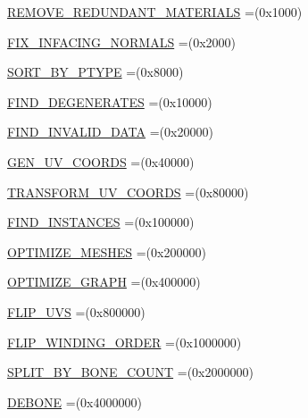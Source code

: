 \begin{DoxyCompactItemize}
\item 
\hyperlink{enumjassimp_1_1_ai_post_process_steps_a7de1d3d57df60b08b9484e6055c1b309}{R\+E\+M\+O\+V\+E\+\_\+\+R\+E\+D\+U\+N\+D\+A\+N\+T\+\_\+\+M\+A\+T\+E\+R\+I\+A\+L\+S} =(0x1000)
\item 
\hyperlink{enumjassimp_1_1_ai_post_process_steps_a21e006d635a60564ed5740bce344f1bc}{F\+I\+X\+\_\+\+I\+N\+F\+A\+C\+I\+N\+G\+\_\+\+N\+O\+R\+M\+A\+L\+S} =(0x2000)
\item 
\hyperlink{enumjassimp_1_1_ai_post_process_steps_a90814c095595a8cb812895e1cc2d97a6}{S\+O\+R\+T\+\_\+\+B\+Y\+\_\+\+P\+T\+Y\+P\+E} =(0x8000)
\item 
\hyperlink{enumjassimp_1_1_ai_post_process_steps_abf87e4bf911759a4141e5ba4596e29c1}{F\+I\+N\+D\+\_\+\+D\+E\+G\+E\+N\+E\+R\+A\+T\+E\+S} =(0x10000)
\item 
\hyperlink{enumjassimp_1_1_ai_post_process_steps_a391f51b2cf726a35d365a0a79ee16cbc}{F\+I\+N\+D\+\_\+\+I\+N\+V\+A\+L\+I\+D\+\_\+\+D\+A\+T\+A} =(0x20000)
\item 
\hyperlink{enumjassimp_1_1_ai_post_process_steps_a828a5efc49f107dce2ce4c4bcf11167c}{G\+E\+N\+\_\+\+U\+V\+\_\+\+C\+O\+O\+R\+D\+S} =(0x40000)
\item 
\hyperlink{enumjassimp_1_1_ai_post_process_steps_ab38ffd98a316098b5b49e9dd85d22c33}{T\+R\+A\+N\+S\+F\+O\+R\+M\+\_\+\+U\+V\+\_\+\+C\+O\+O\+R\+D\+S} =(0x80000)
\item 
\hyperlink{enumjassimp_1_1_ai_post_process_steps_afd860b14d152f4a4a1e9900515d78a71}{F\+I\+N\+D\+\_\+\+I\+N\+S\+T\+A\+N\+C\+E\+S} =(0x100000)
\item 
\hyperlink{enumjassimp_1_1_ai_post_process_steps_ae7fee68ad0e7ad1b5736cfbe62914b52}{O\+P\+T\+I\+M\+I\+Z\+E\+\_\+\+M\+E\+S\+H\+E\+S} =(0x200000)
\item 
\hyperlink{enumjassimp_1_1_ai_post_process_steps_ad9dbc2a5efa1877b72a2998e59783931}{O\+P\+T\+I\+M\+I\+Z\+E\+\_\+\+G\+R\+A\+P\+H} =(0x400000)
\item 
\hyperlink{enumjassimp_1_1_ai_post_process_steps_a53870b589cdfb8305323efcc19915c2b}{F\+L\+I\+P\+\_\+\+U\+V\+S} =(0x800000)
\item 
\hyperlink{enumjassimp_1_1_ai_post_process_steps_a4a57c50d90a729344533e1a0228a654d}{F\+L\+I\+P\+\_\+\+W\+I\+N\+D\+I\+N\+G\+\_\+\+O\+R\+D\+E\+R} =(0x1000000)
\item 
\hyperlink{enumjassimp_1_1_ai_post_process_steps_a5a8d0677d4d0faf473ed2d9c808e74d6}{S\+P\+L\+I\+T\+\_\+\+B\+Y\+\_\+\+B\+O\+N\+E\+\_\+\+C\+O\+U\+N\+T} =(0x2000000)
\item 
\hyperlink{enumjassimp_1_1_ai_post_process_steps_a053968901723f8a9af9100a2ff4079c5}{D\+E\+B\+O\+N\+E} =(0x4000000)
\end{DoxyCompactItemize}


